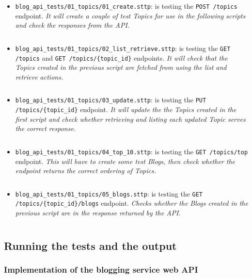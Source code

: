 \begin{itemize}
    \item \verb|blog_api_tests/01_topics/01_create.sttp|: is testing the \verb|POST /topics| endpoint. \textit{It will create a couple of test Topics for use in the following scripts and check the responses from the API.}
    \inputminted[autogobble, breaklines, tabsize=4]{text}{blog_api/blog_api_tests/01_topics/01_create.sttp}
    \item \verb|blog_api_tests/01_topics/02_list_retrieve.sttp|: is testing the \verb|GET /topics| and \verb|GET /topics/{topic_id}| endpoints. \textit{It will check that the Topics created in the previous script are fetched from using the list and retrieve actions.}
    \inputminted[autogobble, breaklines, tabsize=4]{text}{blog_api/blog_api_tests/01_topics/02_list_retrieve.sttp}
    \item \verb|blog_api_tests/01_topics/03_update.sttp|: is testing the \verb|PUT /topics/{topic_id}| endpoint. \textit{It will update the the Topics created in the first script and check whether retrieving and listing each updated Topic serves the correct response.}
    \inputminted[autogobble, breaklines, tabsize=4]{text}{blog_api/blog_api_tests/01_topics/03_update.sttp}
    \item \verb|blog_api_tests/01_topics/04_top_10.sttp|: is testing the \verb|GET /topics/top| endpoint. \textit{This will have to create some test Blogs, then check whether the endpoint returns the correct ordering of Topics.}
    \inputminted[autogobble, breaklines, tabsize=4]{text}{blog_api/blog_api_tests/01_topics/04_top_10.sttp}
    \item \verb|blog_api_tests/01_topics/05_blogs.sttp|: is testing the \verb|GET /topics/{topic_id}/blogs| endpoint. \textit{Checks whether the Blogs created in the previous script are in the response returned by the API.}
    \inputminted[autogobble, breaklines, tabsize=4]{text}{blog_api/blog_api_tests/01_topics/05_blogs.sttp}
\end{itemize}

\subsection{Running the tests and the output}

\subsubsection{Implementation of the blogging service web API}

